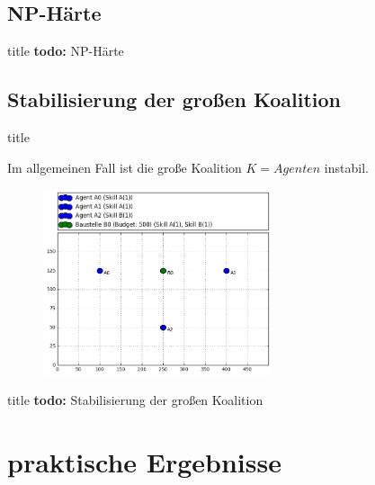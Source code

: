 \documentclass[c]{beamer}
\newcommand\todo[1]{\colorbox{blue!15}{\textbf{todo: }#1}\newline}
\theoremstyle{break}
\begin{document}
  
  \subsection*{NP-Härte}
  \begin{frame}{title} %
    \todo{NP-Härte}
    \begin{lemma}
    
    \end{lemma}
  \end{frame}
  
  
  \subsection*{Stabilisierung der großen Koalition}
  \begin{frame}{title} %
    \begin{lemma}[Instabilität]
      Im allgemeinen Fall ist die große Koalition $K=Agenten$ instabil.  
    \end{lemma}

      \begin{figure}
        \centering
        \includegraphics[width=0.6\textwidth]{example-exchangeable-agents.png}
        \label{szenario1}
      \end{figure}

  \end{frame}
  \begin{frame}{title} %
    \todo{Stabilisierung der großen Koalition}
  \end{frame}
  

  \section*{praktische Ergebnisse}
\end{document}
